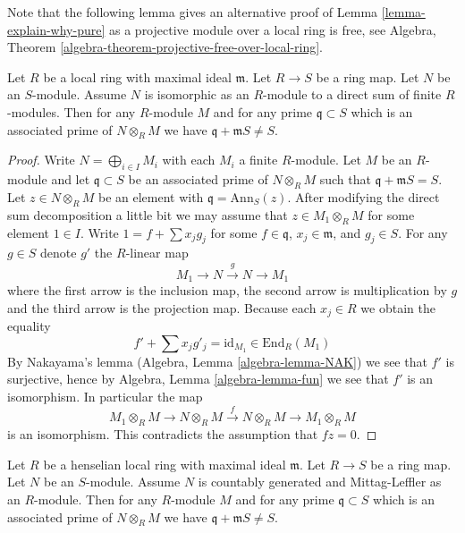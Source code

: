\noindent
Note that the following lemma gives an alternative proof of
Lemma \ref{lemma-explain-why-pure}
as a projective module over a local ring is free, see
Algebra, Theorem \ref{algebra-theorem-projective-free-over-local-ring}.

\begin{lemma}
\label{lemma-explain-why-pure-direct-sum-finite-modules}
Let $R$ be a local ring with maximal ideal $\mathfrak m$.
Let $R \to S$ be a ring map. Let $N$ be an $S$-module.
Assume $N$ is isomorphic as an $R$-module to a direct
sum of finite $R$-modules. Then for any $R$-module $M$ and
for any prime $\mathfrak q \subset S$ which is an associated prime of
$N \otimes_R M$ we have $\mathfrak q + \mathfrak m S \not = S$.
\end{lemma}

\begin{proof}
Write $N = \bigoplus_{i \in I} M_i$ with each $M_i$ a finite $R$-module.
Let $M$ be an $R$-module and let $\mathfrak q \subset S$ be an associated
prime of $N \otimes_R M$ such that $\mathfrak q + \mathfrak m S = S$. Let
$z \in N \otimes_R M$ be an element with $\mathfrak q = \text{Ann}_S(z)$.
After modifying the direct sum decomposition a little bit we may assume that
$z \in M_1 \otimes_R M$ for some element $1 \in I$. Write
$1 = f + \sum x_j g_j$ for some $f \in \mathfrak q$, $x_j \in \mathfrak m$,
and $g_j \in S$. For any $g \in S$ denote $g'$ the $R$-linear map
$$
M_1 \to N \xrightarrow{g} N \to M_1
$$
where the first arrow is the inclusion map, the second arrow is multiplication
by $g$ and the third arrow is the projection map. Because each $x_j \in R$
we obtain the equality
$$
f' + \sum x_j g'_j = \text{id}_{M_1} \in \text{End}_R(M_1)
$$
By Nakayama's lemma
(Algebra, Lemma \ref{algebra-lemma-NAK})
we see that $f'$ is surjective, hence by
Algebra, Lemma \ref{algebra-lemma-fun}
we see that $f'$ is an isomorphism. In particular the map
$$
M_1 \otimes_R M \to N \otimes_R M \xrightarrow{f} N \otimes_R M
\to M_1 \otimes_R M
$$
is an isomorphism. This contradicts the assumption that $fz = 0$.
\end{proof}

\begin{lemma}
\label{lemma-explain-why-pure-ML}
Let $R$ be a henselian local ring with maximal ideal $\mathfrak m$.
Let $R \to S$ be a ring map. Let $N$ be an $S$-module.
Assume $N$ is countably generated and Mittag-Leffler as an $R$-module.
Then for any $R$-module $M$ and for any prime $\mathfrak q \subset S$
which is an associated prime of $N \otimes_R M$ we have
$\mathfrak q + \mathfrak m S \not = S$.
\end{lemma}


